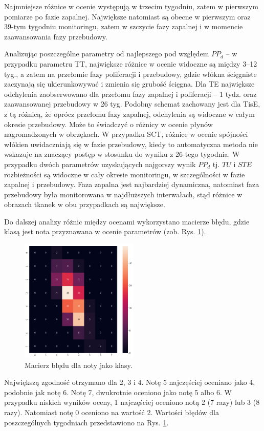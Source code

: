 Najmniejsze różnice w ocenie występują w trzecim tygodniu, zatem w pierwszym pomiarze po fazie zapalnej. Największe natomiast są obecne w pierwszym oraz 39-tym tygodniu monitoringu, zatem w szczycie fazy zapalnej i w momencie zaawansowania fazy przebudowy. 

Analizując poszczególne parametry od najlepszego pod względem $PP_d$ -- w przypadku parametru TT, największe różnice w ocenie widoczne są między 3--12 tyg., a zatem na przełomie fazy poliferacji i przebudowy, gdzie włókna ścięgniste zaczynają się ukierunkowywać i zmienia się grubość ścięgna. Dla TE największe odchylenia zaobserwowano dla przełomu fazy zapalnej i poliferacji -- 1 tydz. oraz zaawansowanej przebudowy w 26 tyg. Podobny schemat zachowany jest dla TisE, z tą różnicą, że oprócz przełomu fazy zapalnej, odchylenia są widoczne w całym okresie przebudowy. Może to świadczyć o różnicy w ocenie płynów nagromadzonych w obrzękach. W przypadku SCT, różnice w ocenie spójności włókien uwidaczniają się w fazie przebudowy, kiedy to automatyczna metoda nie wskazuje na znaczący postęp w stosunku do wyniku z 26-tego tygodnia. W przypadku dwóch parametrów uzyskujących najgorszy wynik $PP_d$ tj. $TU$ i $STE$ rozbieżności są widoczne w cały okresie monitoringu, w szczególności w fazie zapalnej i przebudowy. Faza zapalna jest najbardziej dynamiczna, natomiast faza przebudowy była monitorowana w najdłuższych interwałach, stąd różnice w obrazach tkanek w obu przypadkach są największe. 

Do dalszej analizy różnic między ocenami wykorzystano macierze błędu, gdzie klasą jest nota przyznawana w ocenie parametrów (zob. Rys. \ref{fig:cmscores}).
\begin{figure}[]
	\centering
	\includegraphics[width=0.5\textwidth]{figures/cmScores.png}
	\caption{Macierz błędu dla noty jako klasy.}\label{fig:cmscores}
\end{figure}
Największą zgodność otrzymano dla 2, 3 i 4. Notę 5 najczęściej oceniano jako 4, podobnie jak notę 6. Notę 7, dwukrotnie oceniono jako notę 5 albo 6. W przypadku niskich wyników oceny, 1 najczęściej oceniono notą 2 (7 razy) lub 3 (8 razy). Natomiast notę 0 oceniono na wartość 2. Wartości błędów dla poszczególnych tygodniach przedstawiono na Rys. \ref{fig:cmscores}.

